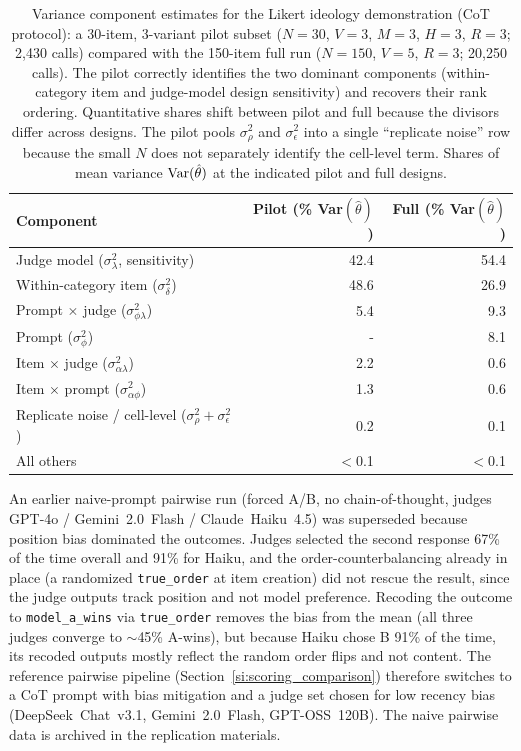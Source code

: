 \begin{table}[ht]
\centering
\caption{Variance component estimates for the Likert ideology demonstration (CoT protocol): a 30-item, 3-variant pilot subset ($N\!=\!30$, $V\!=\!3$, $M\!=\!3$, $H\!=\!3$, $R\!=\!3$; 2,430 calls) compared with the 150-item full run ($N\!=\!150$, $V\!=\!5$, $R\!=\!3$; 20,250 calls). The pilot correctly identifies the two dominant components (within-category item and judge-model design sensitivity) and recovers their rank ordering. Quantitative shares shift between pilot and full because the divisors differ across designs. The pilot pools $\sigma^2_\rho$ and $\sigma^2_\epsilon$ into a single ``replicate noise'' row because the small $N$ does not separately identify the cell-level term. Shares of mean variance $\operatorname{Var}(\hat\theta)$ at the indicated pilot and full designs.}
\label{tab:pilot_vc}
\small
\begin{tabular}{lrr}
\toprule
\textbf{Component} & \textbf{Pilot (\% Var$(\hat\theta)$)} & \textbf{Full (\% Var$(\hat\theta)$)} \\
\midrule
Judge model ($\sigma^2_\lambda$, sensitivity) & 42.4 & 54.4 \\
Within-category item ($\sigma^2_\delta$)      & 48.6 & 26.9 \\
Prompt $\times$ judge ($\sigma^2_{\phi\lambda}$) &  5.4 &  9.3 \\
Prompt ($\sigma^2_\phi$)                       &  -   &  8.1 \\
Item $\times$ judge ($\sigma^2_{\alpha\lambda}$) &  2.2 &  0.6 \\
Item $\times$ prompt ($\sigma^2_{\alpha\phi}$)  &  1.3 &  0.6 \\
Replicate noise / cell-level ($\sigma^2_\rho + \sigma^2_\epsilon$) &  0.2 &  0.1 \\
All others                  & $<$0.1 & $<$0.1 \\
\bottomrule
\end{tabular}
\end{table}

An earlier naive-prompt pairwise run (forced A/B, no chain-of-thought, judges GPT-4o / Gemini~2.0~Flash / Claude~Haiku~4.5) was superseded because position bias dominated the outcomes. Judges selected the second response 67\% of the time overall and 91\% for Haiku, and the order-counterbalancing already in place (a randomized \texttt{true\_order} at item creation) did not rescue the result, since the judge outputs track position and not model preference. Recoding the outcome to \texttt{model\_a\_wins} via \texttt{true\_order} removes the bias from the mean (all three judges converge to $\sim$45\% A-wins), but because Haiku chose B 91\% of the time, its recoded outputs mostly reflect the random order flips and not content. The reference pairwise pipeline (Section~\ref{si:scoring_comparison}) therefore switches to a CoT prompt with bias mitigation and a judge set chosen for low recency bias (DeepSeek~Chat~v3.1, Gemini~2.0~Flash, GPT-OSS~120B). The naive pairwise data is archived in the replication materials.

